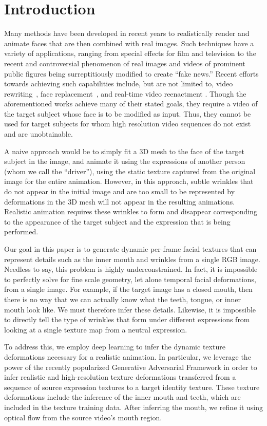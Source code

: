 \section{Introduction}

Many methods have been developed in recent years to realistically render and animate faces that are then combined with real images. Such techniques have a variety of applications, ranging from special effects for film and television to the recent and controversial phenomenon of real images and videos of prominent public figures being surreptitiously modified to create ``fake news.'' Recent efforts towards achieving such capabilities include, but are not limited to, video rewriting~\cite{rewrite}, face replacement~\cite{replace}, and real-time video reenactment \cite{f2f}. Though the aforementioned works achieve many of their stated goals, they require a video of the target subject whose face is to be modified as input.  
Thus, they cannot be used for target subjects for whom high resolution video sequences do not exist and are unobtainable.

A naive approach would be to simply fit a 3D mesh to the face of the target subject in the image, and animate it using the expressions of another person (whom we call the ``driver''), using the 
static texture captured from the original image for the entire animation.  However, in this approach, subtle wrinkles that do not appear in the initial image and are too small to be represented by deformations in the 3D mesh will not appear in the resulting animations. Realistic animation requires these wrinkles to form and disappear corresponding to the appearance of the target subject and the expression that is being performed.

Our goal in this paper is to generate dynamic per-frame facial textures that can represent details such as the inner mouth and wrinkles from a single RGB image. Needless to say, this problem is highly underconstrained.  In fact, it is impossible to perfectly solve for fine scale geometry, let alone temporal facial deformations, from a single image.  For example, if the target image has a closed mouth, then there is no way that we can actually know what the teeth, tongue, or inner mouth look like. We must therefore infer these details.  Likewise, it is
impossible to directly tell the type of wrinkles that form under different expressions from looking at a single texture map from a neutral expression.


To address this, we employ deep learning to infer the dynamic texture deformations necessary for a realistic animation.  In particular, we leverage the power of the recently popularized Generative Adversarial Framework \cite{gan} in order to infer realistic and high-resolution texture deformations transferred from a sequence of source expression textures to a target identity texture.  These texture deformations include the inference of the inner mouth and teeth, which are included in the texture training data.  After inferring the mouth, we refine it using optical flow from the source video's mouth region.

